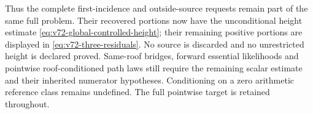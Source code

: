 Thus the complete first-incidence and outside-source requests remain
part of the same full problem. Their recovered portions now have the
unconditional height estimate \eqref{eq:v72-global-controlled-height};
their remaining positive portions are displayed in
\eqref{eq:v72-three-residuals}. No source is discarded and no
unrestricted height is declared proved. Same-roof bridges, forward
essential likelihoods and pointwise roof-conditioned path laws still
require the remaining scalar estimate and their inherited numerator
hypotheses. Conditioning on a zero arithmetic reference class remains
undefined. The full pointwise target is retained throughout.
\label{end:v72-new-mathematics}
